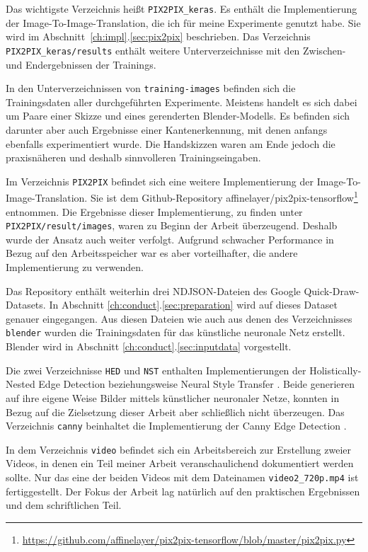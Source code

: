 Das wichtigste Verzeichnis heißt \lstinline|PIX2PIX_keras|. Es enthält die Implementierung der Image-To-Image-Translation, die ich für meine Experimente genutzt habe. Sie wird im Abschnitt~\ref{ch:impl}.\ref{sec:pix2pix} beschrieben. Das Verzeichnis \lstinline|PIX2PIX_keras/results| enthält weitere Unterverzeichnisse mit den Zwischen- und Endergebnissen der Trainings.

In den Unterverzeichnissen von \lstinline|training-images| befinden sich die Trainingsdaten aller durchgeführten Experimente. Meistens handelt es sich dabei um Paare einer Skizze und eines gerenderten Blender-Modells. Es befinden sich darunter aber auch Ergebnisse einer Kantenerkennung, mit denen anfangs ebenfalls experimentiert wurde. Die Handskizzen waren am Ende jedoch die praxisnäheren und deshalb sinnvolleren Trainingseingaben.

Im Verzeichnis \lstinline|PIX2PIX| befindet sich eine weitere Implementierung der Image-To-Image-Translation. Sie ist dem Github-Repository affinelayer/pix2pix-tensorflow\footnote{\href{https://github.com/affinelayer/pix2pix-tensorflow/blob/master/pix2pix.py}{https://github.com/affinelayer/pix2pix-tensorflow/blob/master/pix2pix.py}} entnommen. Die Ergebnisse dieser Implementierung, zu finden unter \lstinline|PIX2PIX/result/images|, waren zu Beginn der Arbeit überzeugend. Deshalb wurde der Ansatz auch weiter verfolgt. Aufgrund schwacher Performance in Bezug auf den Arbeitsspeicher war es aber vorteilhafter, die andere Implementierung zu verwenden.

Das Repository enthält weiterhin drei NDJSON-Dateien des Google Quick-Draw-Datasets. In Abschnitt \ref{ch:conduct}.\ref{sec:preparation} wird auf dieses Dataset genauer eingegangen. Aus diesen Dateien wie auch aus denen des Verzeichnisses \lstinline|blender| wurden die Trainingsdaten für das künstliche neuronale Netz erstellt. Blender wird in Abschnitt \ref{ch:conduct}.\ref{sec:inputdata} vorgestellt.

Die zwei Verzeichnisse \lstinline|HED| und \lstinline|NST| enthalten Implementierungen der Holistically-Nested Edge Detection\cite{xie2015hed} beziehungsweise Neural Style Transfer \cite{gatys2015nst}. Beide generieren auf ihre eigene Weise Bilder mittels künstlicher neuronaler Netze, konnten in Bezug auf die Zielsetzung dieser Arbeit aber schließlich nicht überzeugen. Das Verzeichnis \lstinline|canny| beinhaltet die Implementierung der Canny Edge Detection \cite{canny1986edge}.

In dem Verzeichnis \lstinline|video| befindet sich ein Arbeitsbereich zur Erstellung zweier Videos, in denen ein Teil meiner Arbeit veranschaulichend dokumentiert werden sollte. Nur das eine der beiden Videos mit dem Dateinamen \lstinline|video2_720p.mp4| ist fertiggestellt. Der Fokus der Arbeit lag natürlich auf den praktischen Ergebnissen und dem schriftlichen Teil.

